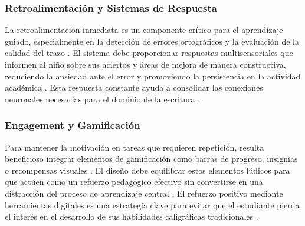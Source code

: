 \subsubsection{Retroalimentación y Sistemas de Respuesta}
La retroalimentación inmediata es un componente crítico para el aprendizaje guiado, especialmente en la detección de errores ortográficos y la evaluación de la calidad del trazo \cite{gelman2014design}. El sistema debe proporcionar respuestas multisensoriales que informen al niño sobre sus aciertos y áreas de mejora de manera constructiva, reduciendo la ansiedad ante el error y promoviendo la persistencia en la actividad académica \cite{gelman2014design}. Esta respuesta constante ayuda a consolidar las conexiones neuronales necesarias para el dominio de la escritura \cite{james2012effects}.

\subsubsection{Engagement y Gamificación}
Para mantener la motivación en tareas que requieren repetición, resulta beneficioso integrar elementos de gamificación como barras de progreso, insignias o recompensas visuales \cite{nngroup2019children}. El diseño debe equilibrar estos elementos lúdicos para que actúen como un refuerzo pedagógico efectivo sin convertirse en una distracción del proceso de aprendizaje central \cite{nngroup2019children}. El refuerzo positivo mediante herramientas digitales es una estrategia clave para evitar que el estudiante pierda el interés en el desarrollo de sus habilidades caligráficas tradicionales \cite{berninger2010teaching}.
